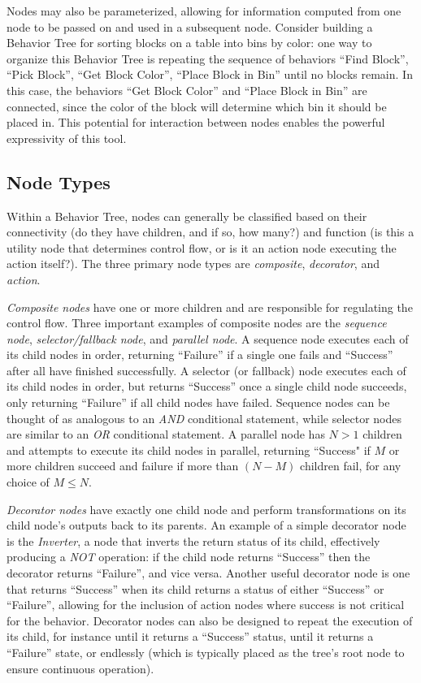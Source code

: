 Nodes may also be parameterized, allowing for information computed from one node to be passed on and used in a subsequent node. Consider building a Behavior Tree for sorting blocks on a table into bins by color: one way to organize this Behavior Tree is repeating the sequence of behaviors ``Find Block'', ``Pick Block'', ``Get Block Color'', ``Place Block in Bin'' until no blocks remain. In this case, the behaviors ``Get Block Color'' and ``Place Block in Bin'' are connected, since the color of the block will determine which bin it should be placed in. This potential for interaction between nodes enables the powerful expressivity of this tool.

\subsection{Node Types}
Within a Behavior Tree, nodes can generally be classified based on their connectivity (do they have children, and if so, how many?) and function (is this a utility node that determines control flow, or is it an action node executing the action itself?). The three primary node types are \emph{composite}, \emph{decorator}, and \emph{action}.

\emph{Composite nodes} have one or more children and are responsible for regulating the control flow. Three important examples of composite nodes are the \emph{sequence node}, \emph{selector/fallback node}, and \emph{parallel node}. A sequence node executes each of its child nodes in order, returning ``Failure'' if a single one fails and ``Success'' after all have finished successfully. A selector (or fallback) node executes each of its child nodes in order, but returns ``Success'' once a single child node succeeds, only returning ``Failure'' if all child nodes have failed. Sequence nodes can be thought of as analogous to an \emph{AND} conditional statement, while selector nodes are similar to an \emph{OR} conditional statement. A parallel node has $N>1$ children and attempts to execute its child nodes in parallel, returning ``Success" if $M$ or more children succeed and failure if more than $(N-M)$ children fail, for any choice of $M\leq N$.

\emph{Decorator nodes} have exactly one child node and perform transformations on its child node's outputs back to its parents. An example of a simple decorator node is the \emph{Inverter}, a node that inverts the return status of its child, effectively producing a \emph{NOT} operation: if the child node returns ``Success'' then the decorator returns ``Failure'', and vice versa. Another useful decorator node is one that returns ``Success'' when its child returns a status of either ``Success'' or ``Failure'', allowing for the inclusion of action nodes where success is not critical for the behavior. Decorator nodes can also be designed to repeat the execution of its child, for instance until it returns a ``Success'' status, until it returns a ``Failure'' state, or endlessly (which is typically placed as the tree's root node to ensure continuous operation).

